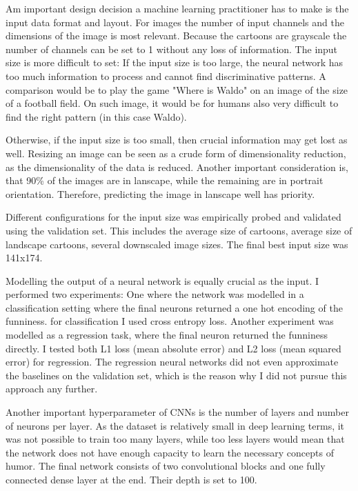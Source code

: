 \documentclass[draft,final,oneside]{vutinfth} %
\begin{document}
Am important design decision a machine learning practitioner has to make is the input data format and layout. For images the number of input channels and the dimensions of the image is most relevant. Because the cartoons are grayscale the number of channels can be set to 1 without any loss of information. The input size is more difficult to set: If the input size is too large, the neural network has too much information to process and cannot find discriminative patterns. A comparison would be to play the game "Where is Waldo" on an image of the size of a football field. On such image, it would be for humans also very difficult to find the right pattern (in this case Waldo).

Otherwise, if the input size is too small, then crucial information may get lost as well. Resizing an image can be seen as a crude form of dimensionality reduction, as the dimensionality of the data is reduced. Another important consideration is, that 90\% of the images are in lanscape, while the remaining are in portrait orientation. Therefore, predicting the image in lanscape well has priority.

Different configurations for the input size was empirically probed and validated using the validation set. This includes the average size of cartoons, average size of landscape cartoons, several downscaled image sizes. The final best input size was 141x174.

Modelling the output of a neural network is equally crucial as the input. I performed two experiments: One where the network was modelled in a classification setting where the final neurons returned a one hot encoding of the funniness. for classification I used cross entropy loss. Another experiment was modelled as a  regression task, where the final neuron returned the funniness directly. I tested both L1 loss (mean absolute error) and L2 loss (mean squared error) for regression. The regression neural networks did not even approximate the baselines on the validation set, which is the reason why I did not pursue this approach any further.

Another important hyperparameter of CNNs is the number of layers and number of neurons per layer. As the dataset is relatively small in deep learning terms, it was not possible to train too many layers, while too less layers would mean that the network does not have enough capacity to learn the necessary concepts of humor. The final network consists of two convolutional blocks and one fully connected dense layer at the end. Their depth is set to 100.
\end{document}
